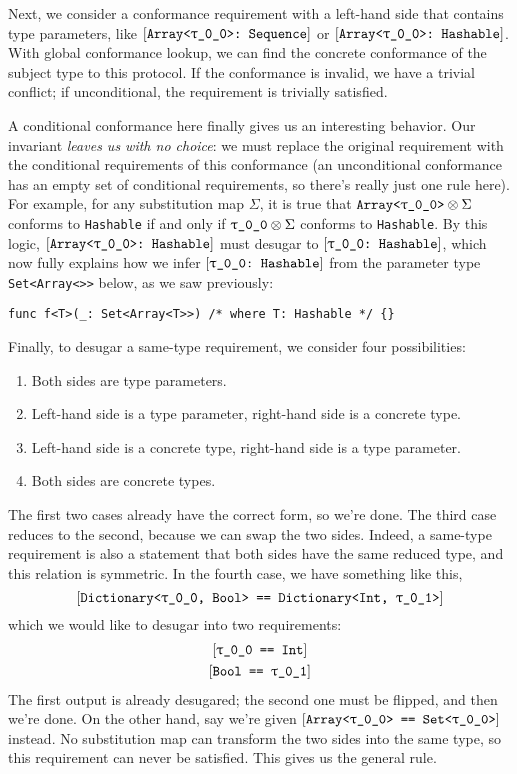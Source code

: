 \documentclass[../generics]{subfiles}
\begin{document}
\smallskip

Next, we consider a conformance requirement with a left-hand side that contains type parameters, like $\ConfReq{Array<\rT>}{Sequence}$ or $\ConfReq{Array<\rT>}{Hashable}$. With global conformance lookup, we can find the concrete conformance of the subject type to this protocol. If the conformance is invalid, we have a trivial conflict; if unconditional, the requirement is trivially satisfied.

A conditional conformance here finally gives us an interesting behavior. Our invariant \textsl{leaves us with no choice}: we must replace the original requirement with the conditional requirements of this conformance (an unconditional conformance has an empty set of conditional requirements, so there's really just one rule here). For example, for any substitution map $\Sigma$, it is true that $\texttt{Array<\rT>}\otimes\Sigma$ conforms to \texttt{Hashable} if and only if $\rT\otimes\Sigma$ conforms to \texttt{Hashable}. By this logic, $\ConfReq{Array<\rT>}{Hashable}$ must desugar to $\ConfReq{\rT}{Hashable}$, which now fully explains how we infer $\ConfReq{\rT}{Hashable}$ from the parameter type \texttt{Set<Array<\rT>>} below, as we saw previously:
\begin{Verbatim}
func f<T>(_: Set<Array<T>>) /* where T: Hashable */ {}
\end{Verbatim}

Finally, to desugar a same-type requirement, we consider four possibilities:
\begin{enumerate}
\item Both sides are type parameters.
\item Left-hand side is a type parameter, right-hand side is a concrete type.
\item Left-hand side is a concrete type, right-hand side is a type parameter.
\item Both sides are concrete types.
\end{enumerate}
The first two cases already have the correct form, so we're done. The third case reduces to the second, because we can swap the two sides. Indeed, a same-type requirement is also a statement that both sides have the same reduced type, and this relation is symmetric. In the fourth case, we have something like this,
\[\SameReq{Dictionary<\rT, Bool>}{Dictionary<Int, \rU>}\]
which we would like to desugar into two requirements:
\begin{gather*}
\SameReq{\rT}{Int}\\
\SameReq{Bool}{\rU}
\end{gather*}
The first output is already desugared; the second one must be flipped, and then we're done. On the other hand, say we're given $\SameReq{Array<\rT>}{Set<\rT>}$ instead. No substitution map can transform the two sides into the same type, so this requirement can never be satisfied. This gives us the general rule.
\end{document}
